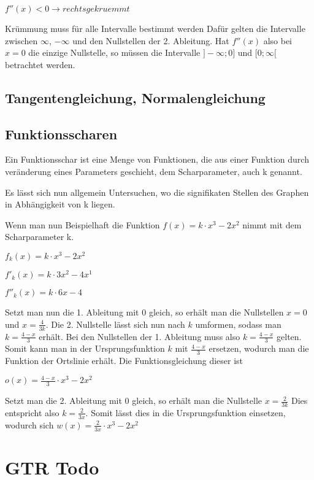$f''(x) < 0 \rightarrow rechts gekruemmt$

Krümmung muss für alle Intervalle bestimmt werden
Dafür gelten die Intervalle zwischen $\infty$, $-\infty$ und den Nullstellen der 2. Ableitung.
Hat $f''(x)$ also bei $x = 0$ die einzige Nullstelle, so müssen die Intervalle $]-\infty;0]$ und $[0;\infty[$
betrachtet werden.

\subsection{Tangentengleichung, Normalengleichung}

\subsection{Funktionsscharen}

Ein Funktionsschar ist eine Menge von Funktionen, die aus einer Funktion durch veränderung
eines Parameters geschieht, dem Scharparameter, auch k genannt.

Es lässt sich nun allgemein Untersuchen, wo die signifikaten Stellen des Graphen in Abhängigkeit
von k liegen.

Wenn man nun Beispielhaft die Funktion $f(x) = k \cdot x^3 - 2x^2$ nimmt mit dem Scharparameter k.

$f_{k}(x) = k \cdot x^3 - 2x^2$

$f'_{k}(x) = k \cdot 3x^2 - 4x^1$

$f''_{k}(x) = k \cdot 6x - 4$

Setzt man nun die 1. Ableitung mit 0 gleich, so erhält man die Nullstellen $x = 0$ und $x = \frac{4}{3k}$.
Die 2. Nullstelle lässt sich nun nach $k$ umformen, sodass man $k = \frac{4 - x}{3}$ erhält.
Bei den Nullstellen der 1. Ableitung muss also $k = \frac{4-x}{3}$ gelten.
Somit kann man in der Ursprungsfunktion $k$ mit $\frac{4-x}{3}$ ersetzen, wodurch man die Funktion
der Ortslinie erhält. Die Funktionsgleichung dieser ist \newline

$o(x) = \frac{4-x}{3} \cdot x^3 - 2x^2$ \newline

Setzt man die 2. Ableitung mit 0 gleich, so erhält man die Nullstelle $x = \frac{2}{3k}$
Dies entspricht also $k = \frac{2}{3x}$. Somit lässt dies in die Ursprungsfunktion einsetzen,
wodurch sich $w(x) = \frac{2}{3x} \cdot x^3 - 2x^2$


\section{GTR Todo}
